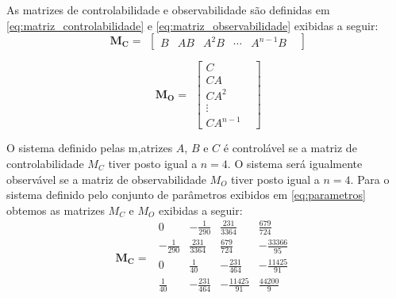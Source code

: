 \documentclass[a4paper]{ifacconf}
\begin{document}
    As matrizes de controlabilidade e observabilidade são definidas em \ref{eq:matriz_controlabilidade} e \ref{eq:matriz_observabilidade} exibidas a seguir:
    \begin{equation} \label{eq:matriz_controlabilidade}
        \begin{split}
             \mathbf{M_C}=
        \end{split}
        \begin{bmatrix}
            B& AB& A^2B& \cdots& A^{n-1}B&
        \end{bmatrix}
    \end{equation}

    \begin{equation} \label{eq:matriz_observabilidade}
        \begin{split}
             \mathbf{M_O}=
        \end{split}
        \begin{bmatrix}
            C&\\
            CA&\\
            CA^2&\\
            \vdots&\\
            CA^{n-1}&
        \end{bmatrix}
    \end{equation}

    O sistema definido pelas m,atrizes $A$, $B$ e $C$ é controlável se a matriz de controlabilidade $M_C$ tiver posto igual a $n=4$. O sistema será igualmente observável se a matriz de observabilidade $M_O$ tiver posto igual a $n=4$. Para o sistema definido pelo conjunto de parâmetros exibidos em \ref{eq:parametros} obtemos as matrizes $M_C$ e $M_O$ exibidas a seguir:
    \FloatBarrier
    \begin{equation} \label{eq:MC}
          \begin{split}
             \mathbf{M_C}=
        \end{split}
    \begin{smallmatrix}
                   0& -\frac{1}{290}&     \frac{231}{3364}&  \frac{679}{724}&\\  
      -\frac{1}{290}&  \frac{231}{3364}&  \frac{679}{724}&   -\frac{33366}{95}&\\
                   0&  \frac{1}{40}&     -\frac{231}{464}&  -\frac{11425}{91}&\\  
        \frac{1}{40}& -\frac{231}{464}&  -\frac{11425}{91}&  \frac{44200}{9}&\\
    \end{smallmatrix}
    \end{equation}
 
\end{document}
